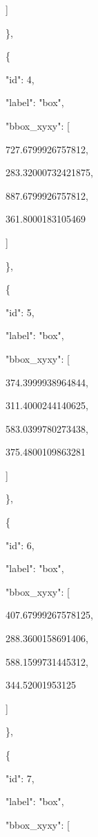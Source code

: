 \documentclass[10pt,a4paper]{article}
\begin{document}
      ]\par
    \},\allowbreak{}\par
    \{\par
      "id":\allowbreak{} 4,\allowbreak{}\par
      "label":\allowbreak{} "box",\allowbreak{}\par
      "bbox\_xyxy":\allowbreak{} [\par
        727.6799926757812,\allowbreak{}\par
        283.32000732421875,\allowbreak{}\par
        887.6799926757812,\allowbreak{}\par
        361.8000183105469\par
      ]\par
    \},\allowbreak{}\par
    \{\par
      "id":\allowbreak{} 5,\allowbreak{}\par
      "label":\allowbreak{} "box",\allowbreak{}\par
      "bbox\_xyxy":\allowbreak{} [\par
        374.3999938964844,\allowbreak{}\par
        311.4000244140625,\allowbreak{}\par
        583.0399780273438,\allowbreak{}\par
        375.4800109863281\par
      ]\par
    \},\allowbreak{}\par
    \{\par
      "id":\allowbreak{} 6,\allowbreak{}\par
      "label":\allowbreak{} "box",\allowbreak{}\par
      "bbox\_xyxy":\allowbreak{} [\par
        407.67999267578125,\allowbreak{}\par
        288.3600158691406,\allowbreak{}\par
        588.1599731445312,\allowbreak{}\par
        344.52001953125\par
      ]\par
    \},\allowbreak{}\par
    \{\par
      "id":\allowbreak{} 7,\allowbreak{}\par
      "label":\allowbreak{} "box",\allowbreak{}\par
      "bbox\_xyxy":\allowbreak{} [\par
\end{document}
